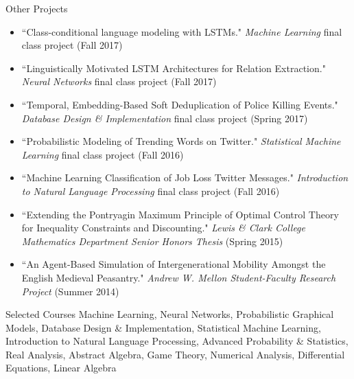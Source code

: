 \documentclass{resume} %
\begin{document}
\begin{rSection}{Other Projects}

\begin{itemize}
\item ``Class-conditional language modeling with LSTMs." \emph{Machine Learning} final class project (Fall 2017)
\item ``Linguistically Motivated LSTM Architectures for Relation Extraction." \emph{Neural Networks} final class project (Fall 2017)  
\item ``Temporal, Embedding-Based Soft Deduplication of Police Killing Events." \emph{Database Design \& Implementation} final class project (Spring 2017) 
\item  ``Probabilistic Modeling of Trending Words on Twitter." \emph{Statistical Machine Learning} final class project (Fall 2016) 
\item ``Machine Learning Classification of Job Loss Twitter Messages." \emph{Introduction to Natural Language Processing} final class project (Fall 2016) 
\item ``Extending the Pontryagin Maximum Principle of Optimal Control Theory for Inequality Constraints and Discounting." \emph{Lewis \& Clark College Mathematics Department Senior Honors Thesis} (Spring 2015)
\item ``An Agent-Based Simulation of Intergenerational Mobility Amongst the English Medieval Peasantry." \emph{Andrew W. Mellon Student-Faculty Research Project} (Summer 2014) 
\end{itemize} 

\end{rSection}



\begin{rSection}{Selected Courses}
Machine Learning, Neural Networks, Probabilistic Graphical Models, Database Design \& Implementation, Statistical Machine Learning, Introduction to Natural Language Processing, Advanced Probability \& Statistics, Real Analysis, Abstract Algebra, Game Theory, Numerical Analysis, Differential Equations, Linear Algebra 
\end{rSection}

\end{document}
